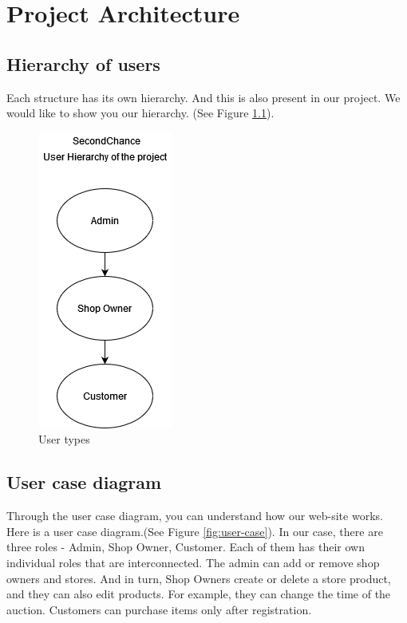 \chapter{Project Architecture}\label{ch:B}

\section{Hierarchy of users}
Each structure has its own hierarchy. And this is also present in our project. We would like to show you our hierarchy. (See Figure \ref{fig:Hierarchy}).

\begin{figure}[h!]
    \centering
    \includegraphics[scale=0.6]{figures/Hierarchy.png}
    \caption{User types}
    \label{fig:Hierarchy}
\end{figure}

\section{User case diagram}
Through the user case diagram, you can understand how our web-site works. Here is a user case diagram.(See Figure \ref{fig:user-case}).
In our case, there are three roles - Admin, Shop Owner, Customer.  Each of them has their own individual roles that are interconnected.  The admin can add or remove shop owners and stores.  And in turn, Shop Owners create or delete a store product, and they can also edit products.  For example, they can change the time of the auction.
Customers can purchase items only after registration.

